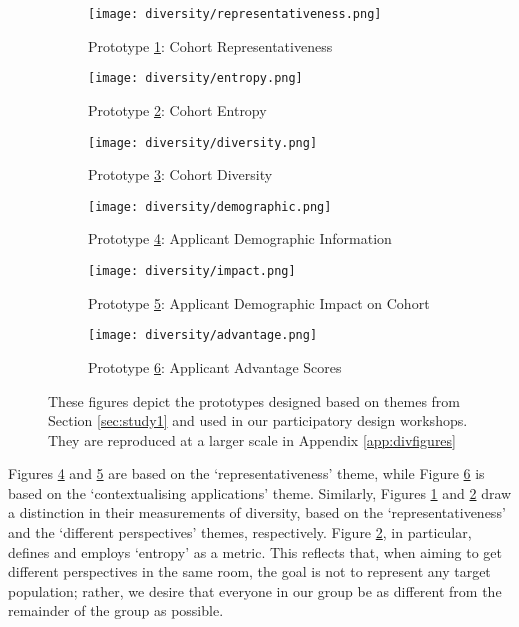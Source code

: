 \begin{figure}[htbp]
    \centering
    \begin{subfigure}[b]{0.3\textwidth}
        \texttt{[image: diversity/representativeness.png]}
        \caption{Prototype \ref{fig:representativeness}: Cohort Representativeness}
        \label{fig:representativeness}
    \end{subfigure}
    \hfill
    \begin{subfigure}[b]{0.3\textwidth}
        \texttt{[image: diversity/entropy.png]}
        \caption{Prototype \ref{fig:entropy}: Cohort Entropy}
        \label{fig:entropy}
    \end{subfigure}
    \hfill
    \begin{subfigure}[b]{0.3\textwidth}
        \texttt{[image: diversity/diversity.png]}
        \caption{Prototype \ref{fig:diversity}: Cohort Diversity}
        \label{fig:diversity}
    \end{subfigure}

    \medskip

    \begin{subfigure}[b]{0.3\textwidth}
        \texttt{[image: diversity/demographic.png]}
        \caption{Prototype \ref{fig:demographic}: Applicant Demographic Information}
        \label{fig:demographic}
    \end{subfigure}
    \hfill
    \begin{subfigure}[b]{0.3\textwidth}
        \texttt{[image: diversity/impact.png]}
        \caption{Prototype \ref{fig:impact}: Applicant Demographic Impact on Cohort}
        \label{fig:impact}
    \end{subfigure}
    \hfill
    \begin{subfigure}[b]{0.3\textwidth}
        \texttt{[image: diversity/advantage.png]}
        \caption{Prototype \ref{fig:advantage}: Applicant Advantage Scores}
        \label{fig:advantage}
    \end{subfigure}
    \caption{These figures depict the prototypes designed based on themes from Section \ref{sec:study1} and used in our participatory design workshops. They are reproduced at a larger scale in Appendix \ref{app:divfigures}}
    \label{fig:prototypes}
\end{figure}

Figures \ref{fig:demographic} and \ref{fig:impact} are based on the `representativeness' theme, while Figure \ref{fig:advantage} is based on the `contextualising applications' theme. Similarly, Figures \ref{fig:representativeness} and \ref{fig:entropy} draw a distinction in their measurements of diversity, based on the `representativeness' and the `different perspectives' themes, respectively. Figure \ref{fig:entropy}, in particular, defines and employs `entropy' as a metric. This reflects that, when aiming to get different perspectives in the same room, the goal is not to represent any target population; rather, we desire that everyone in our group be as different from the remainder of the group as possible.

